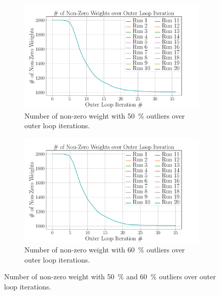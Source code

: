 \begin{figure}[!h]
	\centering
	\begin{subfigure}[b]{0.48\textwidth}
		\centering
		\includegraphics[width=\textwidth]{chapters/2-pose-estimation/fig/GNC-TLS-w-run-50-conv.pdf}
		\caption{Number of non-zero weight with \SI{50}{\percent} outliers over outer loop iterations.}
		\label{app:GNC-TLS-w-run-50-conv}
	\end{subfigure}
	\hfill
	\begin{subfigure}[b]{0.48\textwidth}
		\centering
		\includegraphics[width=\textwidth]{chapters/2-pose-estimation/fig/GNC-TLS-w-run-60-conv.pdf}
		\caption{Number of non-zero weight with \SI{60}{\percent} outliers over outer loop iterations.}
		\label{app:GNC-TLS-w-run-60-conv}
	\end{subfigure}
	\caption{Number of non-zero weight with \SI{50}{\percent} and \SI{60}{\percent} outliers over outer loop iterations.}
	\label{app:GNC-TLS-w-run-50-60-conv}
\end{figure}
